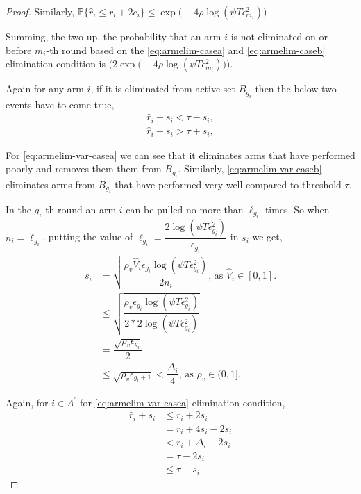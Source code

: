 \begin{proof}
Similarly, $\mathbb{P}\lbrace\hat{r}_{i}\leq r_{i} + 2c_{i}\rbrace\leq \exp\big(-4\rho\log (\psi T\epsilon_{m_{i}}^{2})\big)$
 

Summing, the two up, the probability that an arm ${i}$ is not eliminated on or before $m_{i}$-th round based on the \ref{eq:armelim-casea} and \ref{eq:armelim-caseb} elimination condition is  $\bigg(2\exp\big(-4\rho\log (\psi T\epsilon_{m_{i}}^{2})\big)\bigg)$. 


Again for any arm $i$, if it is eliminated from active set $B_{g_{i}}$ then the below two events have to come true,
\begin{align}
\hat{r}_{i} + s_{i} < \tau - s_{i}, \label{eq:armelim-var-casea}\\
\hat{r}_{i} - s_{i} > \tau + s_{i}, \label{eq:armelim-var-caseb}
\end{align}

For \ref{eq:armelim-var-casea} we can see that it eliminates arms that have performed poorly and removes them them from $B_{g_{i}}$. Similarly, \ref{eq:armelim-var-caseb} eliminates arms from $B_{g_{i}}$ that have performed very well compared to threshold $\tau$.


In the $g_{i}$-th round an arm $i$ can be pulled no more than $\ell_{g_{i}}$ times. So when $n_{i}=\ell_{g_{i}}$, putting the value of $\ell_{g_{i}}=\dfrac{2\log{(\psi T\epsilon_{g_{i}}^{2})}}{\epsilon_{g_{i}}}$ in $s_{i}$ we get, 
\begin{align*}
s_{i}&=\sqrt{\dfrac{\rho_v \hat{V}_{i} \epsilon_{g_{i}}\log (\psi T\epsilon_{g_{i}}^{2})}{2 n_{i}}} \text{, as }\hat{V}_{i}\in [0,1].\\
&\leq \sqrt{\dfrac{\rho_v \epsilon_{g_{i}}\log (\psi T\epsilon_{g_{i}}^{2})}{2*2 \log(\psi T\epsilon_{g_{i}}^{2})}}\\
& =\dfrac{\sqrt{\rho_v \epsilon_{g_{i}}}}{2}\\
& \leq \sqrt{\rho_v \epsilon_{g_{i}+1}} < \dfrac{\Delta_{i}}{4} \text{, as }\rho_v\in (0,1].
\end{align*}

Again, for ${i} \in A^{'}$ for \ref{eq:armelim-var-casea} elimination condition, 
\begin{align*}
\hat{r}_{i} + s_{i}&\leq r_{i} + 2s_{i} \\
&= r_{i} + 4s_{i} - 2s_{i} \\
&< r_{i} + \Delta_{i} - 2s_{i}\\
&= \tau -2s_{i} \\
&\leq \tau - s_{i}
\end{align*}


\end{proof}
